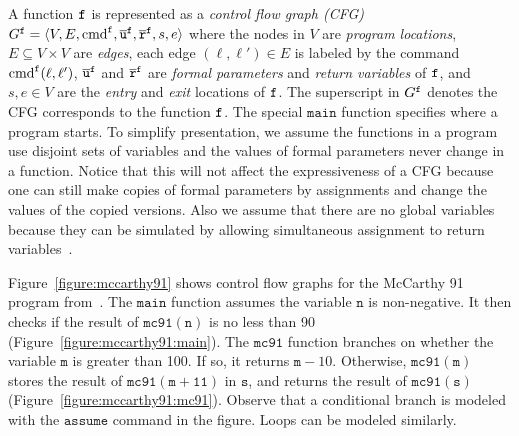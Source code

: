 A function $\mathtt{{f}}$ is represented as a \emph{control flow graph
  (CFG)} $G^{\mathtt{{f}}} = \langle V, E, \textmd{cmd}^{\mathtt{{f}}},
\overline{\mathtt{u}}^{\mathtt{{f}}}, \overline{\mathtt{r}}^{\mathtt{{f}}}, s,
e \rangle$ where the nodes in $V$ are \emph{program locations}, $E
\subseteq V \times V$ are \emph{edges}, each edge $(\ell, \ell') \in
E$ is labeled by the command $\textmd{cmd}^{\mathtt{{f}}} (\ell, \ell')$, $\overline{\mathtt{u}}^{\mathtt{{f}}}$ and $\overline{\mathtt{r}}^{\mathtt{{f}}}$ are \emph{formal parameters} and \emph{return variables} of $\mathtt{{f}}$, and $s,  e \in V$ are the \emph{entry} and \emph{exit} locations of $\mathtt{{f}}$. The superscript in $G^{\mathtt{{f}}}$ denotes the CFG corresponds to the function $\mathtt{{f}}$.
The special $\mathtt{main}$ function specifies where a program starts.
To simplify presentation, we assume the functions in a program use disjoint sets of variables and the values of formal parameters never change in a function. Notice that this will not affect the expressiveness of a CFG because one can still make copies of formal parameters by assignments and change the values of the copied versions. Also we assume that there are no global variables because they can be simulated by allowing simultaneous assignment to return variables~\cite{BallR00}. 

Figure~\ref{figure:mccarthy91} shows control flow graphs for the
McCarthy 91 program from~\cite{MannaP70}. The $\mathtt{main}$ function assumes the
variable $\mathtt{n}$ is non-negative. It then checks if the result
of $\mathtt{mc91(n)}$ is no less than 90
(Figure~\ref{figure:mccarthy91:main}). The $\mathtt{mc91}$ function
branches on whether the variable $\mathtt{m}$ is greater than 100. If
so, it returns $\mathtt{m} - 10$. Otherwise, 
$\mathtt{mc91(m)}$ stores the result of $\mathtt{mc91(m + 11)}$
in $\mathtt{s}$, and returns the result of $\mathtt{mc91(s)}$
(Figure~\ref{figure:mccarthy91:mc91}). Observe that a conditional
branch is modeled with the $\mathtt{assume}$ command in the
figure. Loops can be modeled similarly.

